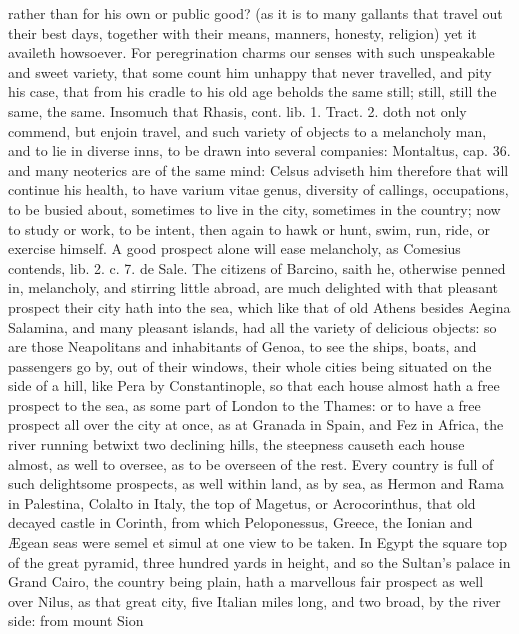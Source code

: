 {rather than for his own or public good? (as it is to many gallants that
travel out their best days, together with their means, manners,
honesty, religion) yet it availeth howsoever. For peregrination charms
our senses with such unspeakable and sweet variety, that some
count him unhappy that never travelled, and pity his case, that from
his cradle to his old age beholds the same still; still, still the
same, the same. Insomuch that Rhasis, cont. lib. 1. Tract. 2.
doth not only commend, but enjoin travel, and such variety of objects
to a melancholy man, and to lie in diverse inns, to be drawn into
several companies: Montaltus, cap. 36. and many neoterics are of the
same mind: Celsus adviseth him therefore that will continue his health,
to have varium vitae genus, diversity of callings, occupations, to be
busied about,  sometimes to live in the city, sometimes in the
country; now to study or work, to be intent, then again to hawk or
hunt, swim, run, ride, or exercise himself. A good prospect alone will
ease melancholy, as Comesius contends, lib. 2. c. 7. de Sale. The
citizens of Barcino, saith he, otherwise penned in, melancholy,
and stirring little abroad, are much delighted with that pleasant
prospect their city hath into the sea, which like that of old Athens
besides Aegina Salamina, and many pleasant islands, had all the variety
of delicious objects: so are those Neapolitans and inhabitants of
Genoa, to see the ships, boats, and passengers go by, out of their
windows, their whole cities being situated on the side of a hill, like
Pera by Constantinople, so that each house almost hath a free prospect
to the sea, as some part of London to the Thames: or to have a free
prospect all over the city at once, as at Granada in Spain, and Fez in
Africa, the river running betwixt two declining hills, the steepness
causeth each house almost, as well to oversee, as to be overseen of the
rest. Every country is full of such delightsome prospects, as
well within land, as by sea, as Hermon and Rama in Palestina,
Colalto in Italy, the top of Magetus, or Acrocorinthus, that old
decayed castle in Corinth, from which Peloponessus, Greece, the Ionian
and \AE{}gean seas were semel et simul at one view to be taken. In Egypt
the square top of the great pyramid, three hundred yards in height, and
so the Sultan's palace in Grand Cairo, the country being plain, hath a
marvellous fair prospect as well over Nilus, as that great city, five
Italian miles long, and two broad, by the river side: from mount Sion
}
